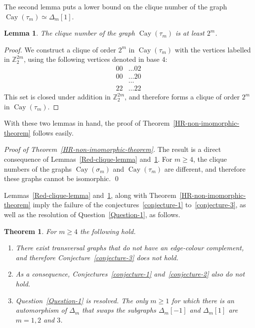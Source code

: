 \documentclass[12pt,a4paper]{article}
\newcommand{\mb}[1]{\mathbb{#1}}
\newcommand{\Cay}{\operatorname{Cay}}
\newcommand{\Z}{\mb{Z}}
\newcommand{\isomorphic}{\simeq}
\newtheorem{Lemma}{Lemma}
\newtheorem{Theorem}{Theorem}
\newenvironment{proofof}[1]{\noindent\emph{Proof of #1.}}{\qed}
\begin{document}
The second lemma puts a lower bound on the clique number of the graph $\Cay(\tau_m) \isomorphic \varDelta_m[1]$.
\begin{Lemma}
\label{Blue-clique-lemma}
The clique number of the graph $\Cay(\tau_m)$ is at least $2^m$.
\end{Lemma}
\begin{proof}
We construct a clique of order $2^m$ in $\Cay(\tau_m)$ with the vertices labelled in $\Z_2^{2m}$, 
using the following vertices denoted in base 4:
\begin{align*}
00 &\ldots 02
\\
00 &\ldots 20
\\
&\ldots
\\
22 &\ldots 22
\end{align*}
This set is closed under addition in $\Z_2^{2 m}$,
and therefore forms a clique of order $2^m$ in $\Cay(\tau_m)$.
\end{proof}

With these two lemmas in hand, the proof of Theorem~\ref{HR-non-imomorphic-theorem} follows easily.

\begin{proofof}{Theorem~\ref{HR-non-imomorphic-theorem}}
The result is a direct consequence of Lemmas~\ref{Red-clique-lemma} and~\ref{Blue-clique-lemma}.
For $m \geqslant 4$, the clique numbers of the graphs $\Cay(\sigma_m)$ and $\Cay(\tau_m)$ are different,
and therefore these graphs cannot be isomorphic.
\end{proofof}

Lemmas~\ref{Red-clique-lemma} and~\ref{Blue-clique-lemma}, along with Theorem~\ref{HR-non-imomorphic-theorem}
imply the failure of the conjectures~\ref{conjecture-1} to~\ref{conjecture-3}, as well as the resolution of Question~\ref{Question-1}, as follows.
\begin{Theorem}
\label{Conjectures-are-false-theorem}
For $m \geqslant 4$ the following hold.
\begin{enumerate}
 \item 
There exist transversal graphs that do not have an edge-colour complement, and
therefore Conjecture~\ref{conjecture-3} does not hold.
\item
As a consequence, Conjectures~\ref{conjecture-1} and~\ref{conjecture-2} also do not hold.
\item
Question~\ref{Question-1} is resolved.
The only $m \geqslant 1$ for which there is an automorphism of $\varDelta_m$ 
that swaps the subgraphs $\varDelta_m[-1]$ and $\varDelta_m[1]$
are $m=1,2$ and $3$.
\end{enumerate}

\end{Theorem}
\end{document}
